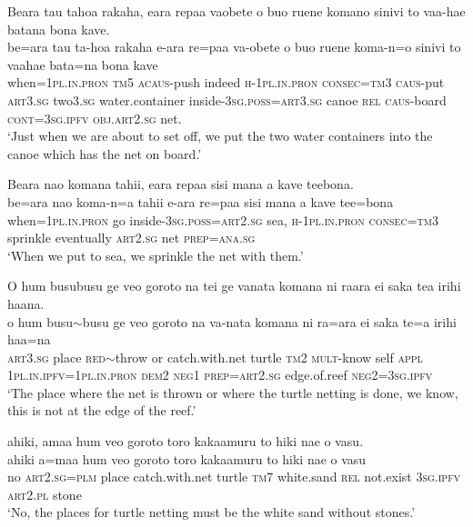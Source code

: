 \newpage
\ea\label{ex:text21-9}
Beara tau tahoa rakaha, eara repaa vaobete o buo ruene komano sinivi to vaa-hae batana bona kave.\\
\gll be=ara	tau	ta-hoa	rakaha	e-ara	re=paa	va-obete	o	buo	ruene	koma-n=o	sinivi	to	vaahae	bata=na	bona	kave\\
     when=1\textsc{pl}.\textsc{in}.\textsc{pron}	\textsc{tm}5	\textsc{acaus}-push	indeed	\textsc{h}-1\textsc{pl}.\textsc{in}.\textsc{pron}	\textsc{consec}=\textsc{tm}3	\textsc{caus}-put	\textsc{art}3.\textsc{sg}	two3.\textsc{sg}	water.container	inside-3\textsc{sg}.\textsc{poss}=\textsc{art}3.\textsc{sg}	canoe	\textsc{rel}	\textsc{caus}-board	\textsc{cont}=3\textsc{sg}.\textsc{ipfv}	\textsc{obj}.\textsc{art}2.\textsc{sg}	net.\\
\glt `Just when we are about to set off, we put the two water containers into the canoe which has the net on board.'
\z

\ea\label{ex:text21-10}
Beara nao komana tahii, eara repaa sisi mana a kave teebona.\\
\gll be=ara	nao	koma-n=a	tahii	e-ara	re=paa	sisi	mana	a	kave	tee=bona\\
     when=1\textsc{pl}.\textsc{in}.\textsc{pron}	go	inside-3\textsc{sg}.\textsc{poss}=\textsc{art}2.\textsc{sg}	sea,	\textsc{h}-1\textsc{pl}.\textsc{in}.\textsc{pron}	\textsc{consec}=\textsc{tm}3	sprinkle	eventually	\textsc{art}2.\textsc{sg}	net	\textsc{prep}=\textsc{ana}.\textsc{sg}\\
\glt `When we put to sea, we sprinkle the net with them.'
\z

\ea\label{ex:text21-11}
O hum busubusu ge veo goroto na tei ge vanata komana ni raara ei saka tea irihi haana.\\
\gll o	hum	busu{$\sim$}busu	ge	veo	goroto	na	va-nata	komana	ni	ra=ara	ei	saka	te=a	irihi	haa=na\\
     \textsc{art}3.\textsc{sg}	place	\textsc{red}{$\sim$}throw	or	catch.with.net	turtle	\textsc{tm}2	\textsc{mult}-know	self	\textsc{appl}	1\textsc{pl}.\textsc{in}.\textsc{ipfv}=1\textsc{pl}.\textsc{in}.\textsc{pron}	\textsc{dem}2	\textsc{neg}1	\textsc{prep}=\textsc{art}2.\textsc{sg}	edge.of.reef	\textsc{neg}2=3\textsc{sg}.\textsc{ipfv}\\
\glt `The place where the net is thrown or where the turtle netting is done, we know, this is not at the edge of the reef.'
\z

\ea\label{ex:text21-12}
ahiki, amaa hum veo goroto toro kakaamuru to hiki nae o vasu.\\
\gll ahiki	a=maa	hum	veo	goroto	toro	kakaamuru	to	hiki	nae	o	vasu\\
     no	\textsc{art}2.\textsc{sg}=\textsc{plm}	place	catch.with.net	turtle	\textsc{tm}7	white.sand	\textsc{rel}	not.exist	3\textsc{sg}.\textsc{ipfv}	\textsc{art}2.\textsc{pl}	stone\\
\glt `No, the places for turtle netting must be the white sand without stones.'
\z

